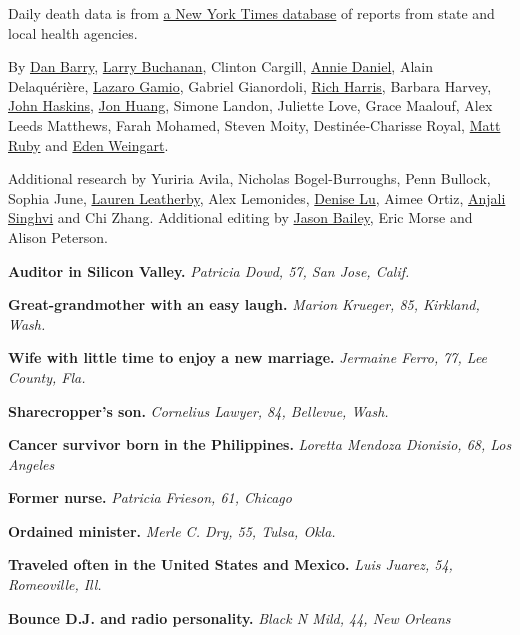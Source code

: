 Daily death data is from
\href{https://www.nytimes.com/interactive/2020/us/coronavirus-us-cases.html}{a
New York Times database} of reports from state and local health
agencies.

By \href{https://www.nytimes.com/by/dan-barry}{Dan Barry},
\href{https://www.nytimes.com/by/larry-buchanan}{Larry Buchanan},
Clinton Cargill, \href{https://www.nytimes.com/by/annie-daniel}{Annie
Daniel}, Alain Delaquérière,
\href{https://www.nytimes.com/by/lazaro-gamio}{Lazaro Gamio}, Gabriel
Gianordoli, \href{https://www.nytimes.com/by/rich-harris}{Rich Harris},
Barbara Harvey, \href{https://www.nytimes.com/by/john-haskins}{John
Haskins}, \href{https://www.nytimes.com/by/jon-huang}{Jon Huang}, Simone
Landon, Juliette Love, Grace Maalouf, Alex Leeds Matthews, Farah
Mohamed, Steven Moity, Destinée-Charisse Royal,
\href{https://www.nytimes.com/by/matt-ruby}{Matt Ruby} and
\href{https://www.nytimes.com/by/eden-weingart}{Eden Weingart}.

Additional research by Yuriria Avila, Nicholas Bogel-Burroughs, Penn
Bullock, Sophia June,
\href{https://www.nytimes.com/by/lauren-leatherby}{Lauren Leatherby},
Alex Lemonides, \href{https://www.nytimes.com/by/denise-lu}{Denise Lu},
Aimee Ortiz, \href{https://www.nytimes.com/by/anjali-singhvi}{Anjali
Singhvi} and Chi Zhang. Additional editing by
\href{https://www.nytimes.com/by/jason-bailey}{Jason Bailey}, Eric Morse
and Alison Peterson.

\textbf{Auditor in Silicon Valley.} \emph{Patricia Dowd, 57, San Jose,
Calif.}

\textbf{Great-grandmother with an easy laugh.} \emph{Marion Krueger, 85,
Kirkland, Wash.}

\textbf{Wife with little time to enjoy a new marriage.} \emph{Jermaine
Ferro, 77, Lee County, Fla.}

\textbf{Sharecropper's son.} \emph{Cornelius Lawyer, 84, Bellevue,
Wash.}

\textbf{Cancer survivor born in the Philippines.} \emph{Loretta Mendoza
Dionisio, 68, Los Angeles}

\textbf{Former nurse.} \emph{Patricia Frieson, 61, Chicago}

\textbf{Ordained minister.} \emph{Merle C. Dry, 55, Tulsa, Okla.}

\textbf{Traveled often in the United States and Mexico.} \emph{Luis
Juarez, 54, Romeoville, Ill.}

\textbf{Bounce D.J. and radio personality.} \emph{Black N Mild, 44, New
Orleans}

